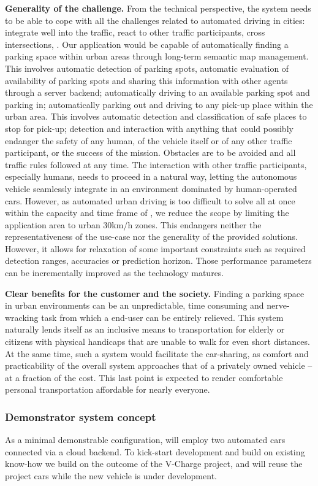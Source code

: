 \textbf{Generality of the challenge.}
From the technical perspective, the system needs to be able to cope with all the challenges related to automated driving in cities: integrate well into the traffic, react to other traffic participants, cross intersections, \etc.
Our application would be capable of automatically finding a parking space within urban areas through long-term semantic map management. This involves automatic detection of parking spots, automatic evaluation of availability of parking spots and sharing this information with other agents through a server backend; automatically driving to an available parking spot and parking in; automatically parking out and driving to any pick-up place within the urban area. This involves automatic detection and classification of safe places to stop for pick-up; detection and interaction with anything that could possibly endanger the safety of any human, of the vehicle itself or of any other traffic participant, or the success of the mission. Obstacles are to be avoided and all traffic rules followed at any time. The interaction with other traffic participants, especially humans, needs to proceed in a natural way, letting the autonomous vehicle seamlessly integrate in an environment dominated by human-operated cars. However, as automated urban driving is too difficult to solve all at once within the capacity and time frame of \Project, we reduce the scope by limiting the application area to urban 30km/h zones. This endangers neither the representativeness of the use-case nor the generality of the provided solutions. However, it allows  for relaxation of some important constraints such as required detection ranges, accuracies or prediction horizon. Those performance parameters can be incrementally improved as the technology matures.

\textbf{Clear benefits for the customer and the society.}
Finding a parking space in urban environments can be an unpredictable, time consuming and nerve-wracking task from which a end-user can be entirely relieved.
This system naturally lends itself as an inclusive means to transportation for elderly or citizens with physical handicaps that are unable to walk for even short distances. At the same time, such a system would facilitate the car-sharing, as comfort and practicability of the overall system approaches that of a privately owned vehicle -- at a fraction of the cost. This last point is expected to render comfortable personal transportation affordable for nearly everyone.


\subsubsection{Demonstrator system concept }
As a minimal demonstrable configuration, \Project{} will employ two automated cars connected via a cloud backend. To kick-start development and build on existing know-how we build on the outcome of the V-Charge project, and will reuse the project cars while the new vehicle is under development. 

